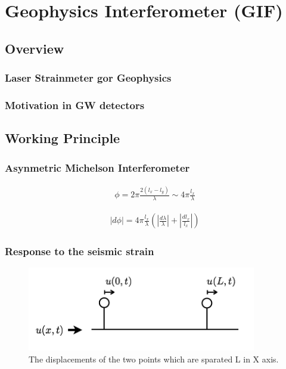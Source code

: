 \chapter{Geophysics Interferometer (GIF)}



\section{Overview} 
\subsection{Laser Strainmeter gor Geophysics}
\subsection{Motivation in GW detectors}


\section{Working Principle}

\subsection{Asynmetric Michelson Interferometer}
\begin{eqnarray}
  \phi = 2\pi\frac{2(l_x-l_y)}{\lambda}\sim4\pi\frac{l_x}{\lambda}
\end{eqnarray}

\begin{eqnarray}
  |d\phi| = 4\pi\frac{l_x}{\lambda}\left( \left|\frac{d\lambda}{\lambda}\right| + \left|\frac{dl_x}{l_x}\right| \right)
\end{eqnarray}


\subsection{Response to the seismic strain}
\begin{figure}[h]
  \begin{center}
    \includegraphics[width=10.0cm]{./img_chap4/img410.png}
    \caption{The displacements of the two points which are sparated L in X axis. }
  \end{center}
\end{figure}

